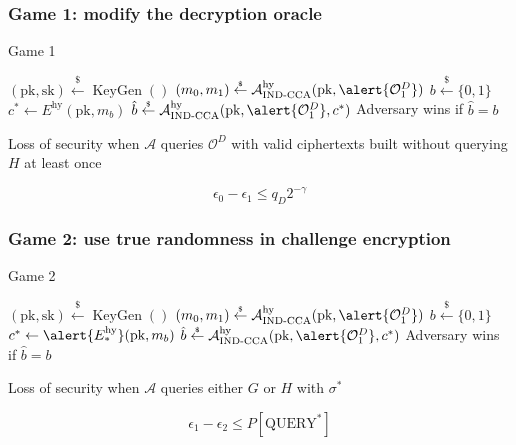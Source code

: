 \documentclass{beamer}
\newcommand{\leftsample}{\overset{{\scriptscriptstyle\$}}{\leftarrow}}
\begin{document}
\begin{frame}
    \frametitle{Game 1: modify the decryption oracle}

    \begin{algorithm}[H]
    \SetAlgoLined
    \caption{Game 1}
    $(\text{pk}, \text{sk}) \leftsample \operatorname{KeyGen}()$\;
    $(m_0, m_1) \leftsample
        \mathcal{A}^\text{hy}_\text{IND-CCA}(\text{pk}, \alert{\mathcal{O}^D_1})
    $\;
    $b \leftsample \{0, 1\}$\;
    $c^\ast \leftarrow E^\text{hy}(\text{pk}, m_b)$\;
    $\hat{b} \leftsample \mathcal{A}^\text{hy}_\text{IND-CCA}(
        \text{pk}, \alert{\mathcal{O}^D_1}, c^\ast
    )$\;
    Adversary wins if $\hat{b} = b$\;

    \end{algorithm}

    Loss of security when $\mathcal{A}$ queries $\mathcal{O}^D$ with valid ciphertexts built without querying $H$ at least once

    \begin{equation*}
        \epsilon_0 - \epsilon_1 \leq q_D2^{-\gamma}
    \end{equation*}
    
\end{frame}

\begin{frame}
    \frametitle{Game 2: use true randomness in challenge encryption}

    \begin{algorithm}[H]
    \SetAlgoLined
    \caption{Game 2}
    $(\text{pk}, \text{sk}) \leftsample \operatorname{KeyGen}()$\;
    $(m_0, m_1) \leftsample
        \mathcal{A}^\text{hy}_\text{IND-CCA}(\text{pk}, \alert{\mathcal{O}^D_1})
    $\;
    $b \leftsample \{0, 1\}$\;
    $c^\ast \leftarrow \alert{E^\text{hy}_\ast}(\text{pk}, m_b)$\;
    $\hat{b} \leftsample \mathcal{A}^\text{hy}_\text{IND-CCA}(
        \text{pk}, \alert{\mathcal{O}^D_1}, c^\ast
    )$\;
    Adversary wins if $\hat{b} = b$\;

    \end{algorithm}
    
    Loss of security when $\mathcal{A}$ queries either $G$ or $H$ with $\sigma^\ast$

    \begin{equation*}
        \epsilon_1 - \epsilon_2 \leq P[\text{QUERY}^\ast]
    \end{equation*}
\end{frame}
\end{document}
